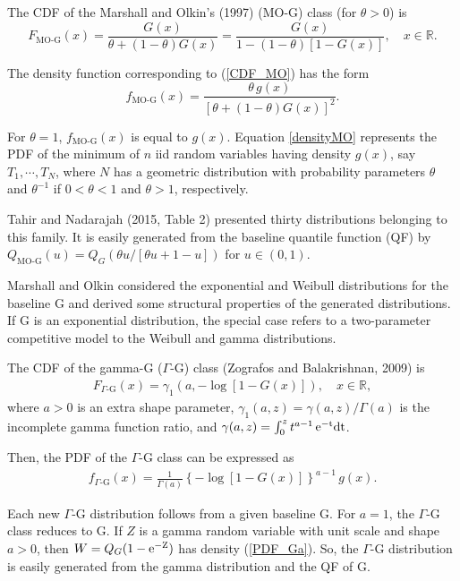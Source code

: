 \documentclass[twoside,leqno,11pt]{article}
\begin{document}
The CDF of the Marshall and Olkin's (1997) ($\text{MO-G}$) 
class (for $\theta>0$) is
\begin{equation}\label{CDF_MO}
F_{\text{MO-G}}(x)=\frac{G(x)}{\theta+(1-\theta)G(x)}=\frac{G(x)}{1-(1-\theta)[1-G(x)]},\quad x \in \mathbb{R}.
\end{equation}

The density function corresponding to (\ref{CDF_MO}) has the form
\begin{equation}\label{densityMO}
f_{\text{MO-G}}(x)=\frac{\theta\, g(x)}{[\theta+(1-\theta)G(x)]^{2}}.
\end{equation}

For $\theta=1$, $f_{\text{MO-G}}(x)$ is equal to $g(x)$. 
Equation \eqref{densityMO} represents the PDF of the minimum of $n$ iid random variables having density $g(x)$, say $T_1,\cdots,T_N$, 
where $N$ has a geometric distribution with probability parameters $\theta$ and $\theta^{-1}$ if $0<\theta<1$ and $\theta>1$, 
respectively.

Tahir and Nadarajah (2015, Table 2) presented thirty 
distributions belonging to this family. It is easily generated 
from the baseline quantile function (QF) by
$Q_{\text{MO-G}}(u)=Q_{G}\left(\theta u / \left[\theta u+1-u\right]\right)$ for $u\in(0,1)$.

Marshall and Olkin considered the exponential and Weibull distributions for the baseline G and derived some
structural properties of the generated distributions. 
If G is an exponential distribution, the special case 
refers to a two-parameter competitive model to the 
Weibull and gamma distributions.

The CDF of the gamma-G ($\Gamma$-G) class (Zografos and Balakrishnan, 2009) is
\begin{eqnarray}\label{CDF_Ga}
F_{\Gamma\text{-G}}(x)=\gamma_1\left( a, -\log \left[1-G(x)\right]\right), \quad x \in \mathbb{R},
\end{eqnarray}
where $a>0$ is an extra shape parameter, $\gamma_1(a,z)= \gamma(a,z)/\Gamma(a)$ is the incomplete gamma function ratio, 
and $\gamma(a,z)=\int_0^{z} t^{a-1}\,\rm{e}^{-t}dt$.

Then, the PDF of the $\Gamma$-G class can be expressed as
\begin{eqnarray}\label{PDF_Ga}
\displaystyle
f_{\Gamma\text{-G}}(x)=\frac{\displaystyle 1}{\displaystyle \Gamma(a)} \left\{ -\log[1-G(x)] \right\}^{a-1}\, g(x).
\end{eqnarray}

Each new $\Gamma$-G distribution follows from a given 
baseline G. For $a=1$, the $\Gamma$-G class reduces to G.
If $Z$ is a gamma random variable with unit scale
and shape $a>0$, then $W=Q_G(1-\rm{e}^{-Z})$ has density (\ref{PDF_Ga}). So, the $\Gamma$-G distribution is easily 
generated from the gamma distribution and the QF of G.
\end{document}
